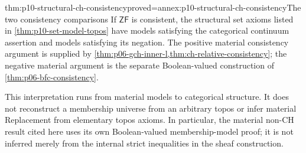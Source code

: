 \begin{hbcorollary}{thm:p10-structural-ch-consistency}{proved=annex:p10-structural-ch-consistency}{The two consistency comparisons}
If \(\mathsf{ZF}\) is consistent, the structural set axioms
listed in \cref{thm:p10-set-model-topos} have models satisfying
the categorical continuum assertion and models satisfying its
negation.
The positive material consistency argument is supplied by
\cref{thm:p06-gch-inner-l,thm:ch-relative-consistency};
the negative material argument is the separate Boolean-valued
construction of \cref{thm:p06-bfc-consistency}.
\end{hbcorollary}

This interpretation runs from material models to categorical
structure. It does not reconstruct a membership universe from an
arbitrary topos or infer material Replacement from elementary
topos axioms. In particular, the material non-CH result cited here
uses its own Boolean-valued membership-model proof; it is not
inferred merely from the internal strict inequalities in the
sheaf construction.

